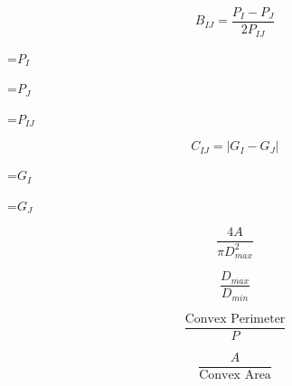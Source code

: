 {\newpage
\clearpage
\samepage \begin{displaymath}B_{IJ} = \frac{P_I - P_J}{2P_{IJ}} \end{displaymath}
}

{\newpage
\clearpage
\samepage \setbox\sizebox=\hbox{$P_I$}\box\sizebox
}

{\newpage
\clearpage
\samepage \setbox\sizebox=\hbox{$P_J$}\box\sizebox
}

{\newpage
\clearpage
\samepage \setbox\sizebox=\hbox{$P_{IJ}$}\box\sizebox
}

{\newpage
\clearpage
\samepage \begin{displaymath}C_{IJ} = | G_I - G_J | \end{displaymath}
}

{\newpage
\clearpage
\samepage \setbox\sizebox=\hbox{$G_I$}\box\sizebox
}

{\newpage
\clearpage
\samepage \setbox\sizebox=\hbox{$G_J$}\box\sizebox
}

{\newpage
\clearpage
\samepage \begin{displaymath}\frac{4 A}{\pi D_{max}^2} \end{displaymath}
}

{\newpage
\clearpage
\samepage \begin{displaymath}\frac{D_{max}}{D_{min}} \end{displaymath}
}

{\newpage
\clearpage
\samepage \begin{figure}\centerline{}
 
\label{fig:area}
\end{figure}
}

{\newpage
\clearpage
\samepage \begin{displaymath}\frac{\mbox{Convex Perimeter}}{P} \end{displaymath}
}

{\newpage
\clearpage
\samepage \begin{displaymath}\frac{A}{\mbox{Convex Area}}              \end{displaymath}
}

